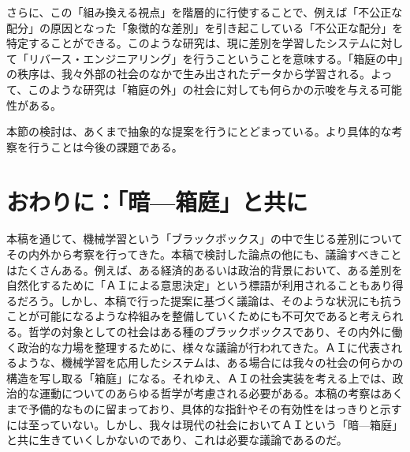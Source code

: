 \documentclass[b5j,twoside,twocolumn]{utarticle}
\begin{document}
さらに、この「組み換える視点」を階層的に行使することで、例えば「不公正な配分」の原因となった「象徴的な差別」を引き起こしている「不公正な配分」を特定することができる。このような研究は、現に差別を学習したシステムに対して「リバース・エンジニアリング」を行うこということを意味する。「箱庭の中」の秩序は、我々外部の社会のなかで生み出されたデータから学習される。よって、このような研究は「箱庭の外」の社会に対しても何らかの示唆を与える可能性がある。


本節の検討は、あくまで抽象的な提案を行うにとどまっている。より具体的な考察を行うことは今後の課題である。











\section{おわりに：「暗---箱庭」と共に}
本稿を通じて、機械学習という「ブラックボックス」の中で生じる差別についてその内外から考察を行ってきた。本稿で検討した論点の他にも、議論すべきことはたくさんある。例えば、ある経済的あるいは政治的背景において、ある差別を自然化するために「ＡＩによる意思決定」という標語が利用されることもあり得るだろう。しかし、本稿で行った提案に基づく議論は、そのような状況にも抗うことが可能になるような枠組みを整備していくためにも不可欠であると考えられる。哲学の対象としての社会はある種のブラックボックスであり、その内外に働く政治的な力場を整理するために、様々な議論が行われてきた。ＡＩに代表されるような、機械学習を応用したシステムは、ある場合には我々の社会の何らかの構造を写し取る「箱庭」になる。それゆえ、ＡＩの社会実装を考える上では、政治的な運動についてのあらゆる哲学が考慮される必要がある。本稿の考察はあくまで予備的なものに留まっており、具体的な指針やその有効性をはっきりと示すには至っていない。しかし、我々は現代の社会においてＡＩという「暗---箱庭」と共に生きていくしかないのであり、これは必要な議論であるのだ。




\end{document}
